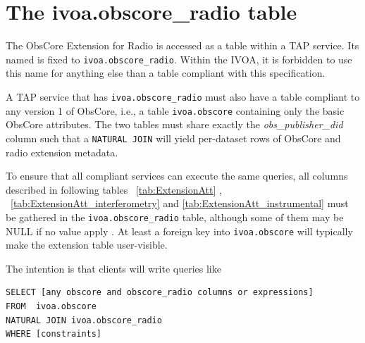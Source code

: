 \documentclass[11pt,a4paper]{ivoa}
\begin{document}

\section{The ivoa.obscore\_radio table}
\label{sec:implementation}
The ObsCore Extension for Radio is accessed as a table within a TAP
\citep{2019ivoa.spec.0927D} service.  Its named is  fixed to \verb|ivoa.obscore_radio|.
Within the IVOA, it is forbidden to use this name for anything else than a table compliant
with this specification.


A TAP service that has \verb|ivoa.obscore_radio| must also have a table
compliant to any version 1 of ObsCore, i.e., a table
\verb|ivoa.obscore| containing only the basic ObsCore attributes. The two tables must share exactly the \emph{obs\_publisher\_did} column such
that a \verb|NATURAL JOIN| will yield per-dataset rows of ObsCore and
radio extension metadata.  

To ensure that all compliant services can execute the same queries,
all columns described in following tables ~\ref{tab:ExtensionAtt} , ~\ref{tab:ExtensionAtt_interferometry} and \ref{tab:ExtensionAtt_instrumental} must be gathered  in the \verb|ivoa.obscore_radio|
table, although some of them may be NULL if no value apply . At least a foreign key into \verb|ivoa.obscore| will typically
make the extension table user-visible.

The intention is that clients will write queries like
\begin{lstlisting}
SELECT [any obscore and obscore_radio columns or expressions]
FROM  ivoa.obscore
NATURAL JOIN ivoa.obscore_radio
WHERE [constraints]
\end{lstlisting}


\end{document}
